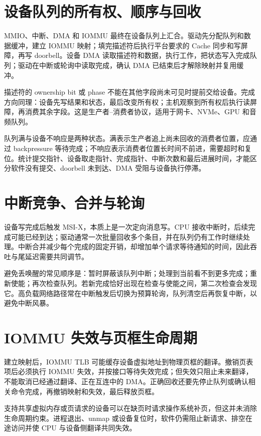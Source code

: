 \section{设备队列的所有权、顺序与回收}

MMIO、中断、DMA 和 IOMMU 最终在设备队列上汇合。驱动先分配队列和数据缓冲，建立 IOMMU 映射；填完描述符后执行平台要求的 Cache 同步和写屏障，再写 doorbell。设备 DMA 读取描述符和数据，执行工作，把状态写入完成队列；驱动在中断或轮询中读取完成，确认 DMA 已结束后才解除映射并复用缓冲。

描述符的 ownership bit 或 phase 不能在其他字段尚未可见时提前交给设备。完成方向同理：设备先写结果和状态，最后改变所有权；主机观察到所有权后执行读屏障，再消费其余字段。这是生产者--消费者协议，适用于网卡、NVMe、GPU 和音频队列。

队列满与设备不响应是两种状态。满表示生产者追上尚未回收的消费者位置，应通过 backpressure 等待完成；不响应表示消费者位置长时间不前进，需要超时和复位。统计提交指针、设备取走指针、完成指针、中断次数和最后进展时间，才能区分软件没有提交、doorbell 未到达、DMA 受阻与设备执行停滞。

\section{中断竞争、合并与轮询}

设备写完成后触发 MSI-X，本质上是一次定向消息写。CPU 接收中断时，后续完成可能已经到达；驱动通常一次批量回收多个条目，并在队列仍有工作时继续处理。中断合并减少每个完成的固定开销，却增加单个请求等待通知的时间，因此吞吐与尾延迟需要共同调节。

避免丢唤醒的常见顺序是：暂时屏蔽该队列中断；处理到当前看不到更多完成；重新使能；再次检查队列。若新完成恰好出现在检查与使能之间，第二次检查会发现它。高负载网络路径常在中断触发后切换为预算轮询，队列清空后再恢复中断，以避免中断风暴。

\section{IOMMU 失效与页框生命周期}

建立映射后，IOMMU TLB 可能缓存设备虚拟地址到物理页框的翻译。撤销页表项后必须执行 IOMMU 失效，并按接口等待失效完成；但失效只阻止未来翻译，不能取消已经通过翻译、正在互连中的 DMA。正确回收还要先停止队列或确认相关命令完成，再撤销映射和失效，最后释放页框。

支持共享虚拟内存或页请求的设备可以在缺页时请求操作系统补页，但这并未消除生命周期约束。进程退出、unmap 或设备复位时，软件仍需阻止新请求、排空在途访问并使 CPU 与设备侧翻译共同失效。

